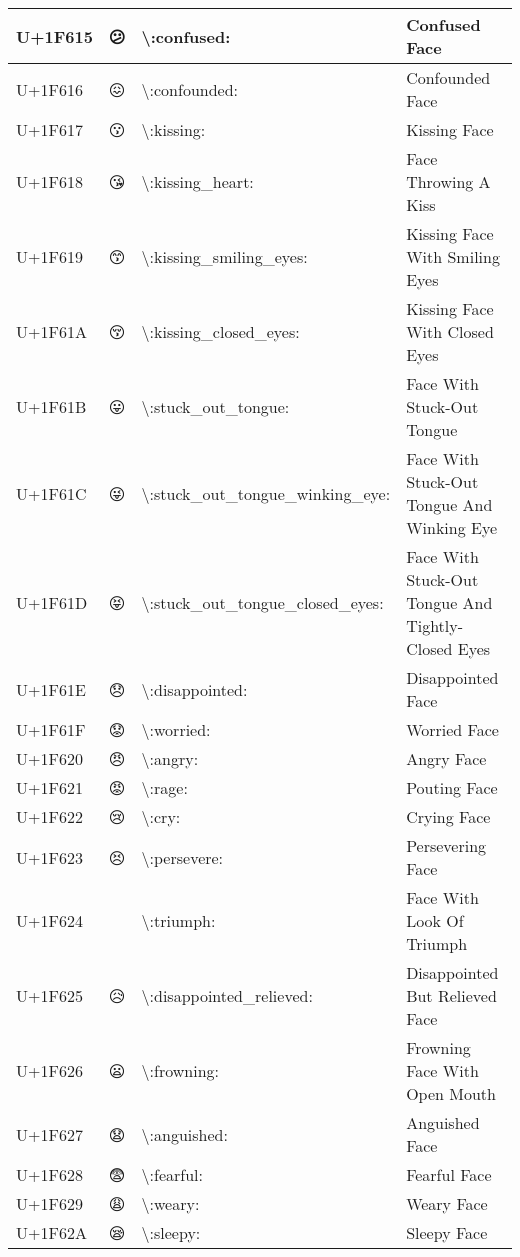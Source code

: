 \begin{table}[h]
\begin{tabulary}{\linewidth}{|L|L|L|L|}
\hline
U+1F615 & 😕 & {\textbackslash}:confused: & Confused Face \\
\hline
U+1F616 & 😖 & {\textbackslash}:confounded: & Confounded Face \\
\hline
U+1F617 & 😗 & {\textbackslash}:kissing: & Kissing Face \\
\hline
U+1F618 & 😘 & {\textbackslash}:kissing\_heart: & Face Throwing A Kiss \\
\hline
U+1F619 & 😙 & {\textbackslash}:kissing\_smiling\_eyes: & Kissing Face With Smiling Eyes \\
\hline
U+1F61A & 😚 & {\textbackslash}:kissing\_closed\_eyes: & Kissing Face With Closed Eyes \\
\hline
U+1F61B & 😛 & {\textbackslash}:stuck\_out\_tongue: & Face With Stuck-Out Tongue \\
\hline
U+1F61C & 😜 & {\textbackslash}:stuck\_out\_tongue\_winking\_eye: & Face With Stuck-Out Tongue And Winking Eye \\
\hline
U+1F61D & 😝 & {\textbackslash}:stuck\_out\_tongue\_closed\_eyes: & Face With Stuck-Out Tongue And Tightly-Closed Eyes \\
\hline
U+1F61E & 😞 & {\textbackslash}:disappointed: & Disappointed Face \\
\hline
U+1F61F & 😟 & {\textbackslash}:worried: & Worried Face \\
\hline
U+1F620 & 😠 & {\textbackslash}:angry: & Angry Face \\
\hline
U+1F621 & 😡 & {\textbackslash}:rage: & Pouting Face \\
\hline
U+1F622 & 😢 & {\textbackslash}:cry: & Crying Face \\
\hline
U+1F623 & 😣 & {\textbackslash}:persevere: & Persevering Face \\
\hline
U+1F624 & 😤 & {\textbackslash}:triumph: & Face With Look Of Triumph \\
\hline
U+1F625 & 😥 & {\textbackslash}:disappointed\_relieved: & Disappointed But Relieved Face \\
\hline
U+1F626 & 😦 & {\textbackslash}:frowning: & Frowning Face With Open Mouth \\
\hline
U+1F627 & 😧 & {\textbackslash}:anguished: & Anguished Face \\
\hline
U+1F628 & 😨 & {\textbackslash}:fearful: & Fearful Face \\
\hline
U+1F629 & 😩 & {\textbackslash}:weary: & Weary Face \\
\hline
U+1F62A & 😪 & {\textbackslash}:sleepy: & Sleepy Face \\

\end{tabulary}
\end{table}
